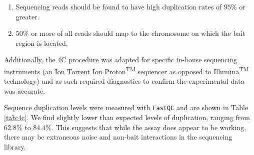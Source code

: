 \documentclass[a4paper,11pt,oneside]{book}
\begin{document}
\begin{enumerate}
\item Sequencing reads should be found to have high duplication rates of $95\%$ or greater.
\item $50\%$ or more of all reads should map to the chromosome on which the bait region is located.
\end{enumerate}


Additionally, the 4C procedure\cite{Stadhouders2013} was adapted for specific in-house sequencing instruments (an Ion Torrent Ion Proton\textsuperscript{TM} sequencer as opposed to Illumina\textsuperscript{TM} technology) and as such required diagnostics to confirm the experimental data was accurate. 

Sequence duplication levels were measured with \texttt{FastQC}\cite{fastqc} and are shown in Table \ref{tab:4c}. We find slightly lower than expected levels of duplication, ranging from $62.8\%$ to $84.4\%$. This suggests that while the assay does appear to be working, there may be extraneous noise and non-bait interactions in the sequencing library.
\end{document}
